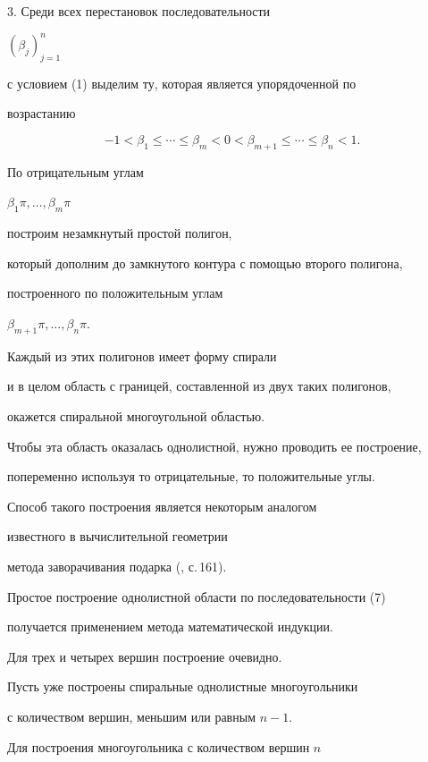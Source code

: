 3. Среди всех перестановок последовательности


$(\beta _{j})_{j=1}^{n}$


с условием (1) выделим ту, которая является упорядоченной по


возрастанию


\begin{equation}


-1 <\beta_{1}\le \dotsb \le \beta _{m}< 0 <


\beta _{m+1}\le \dotsb \le \beta _{n} < 1.


\end{equation}




По отрицательным углам


$\beta _{1}\pi,\dotsc,\beta _{m}\pi$


построим незамкнутый простой полигон,


который дополним до замкнутого контура с помощью второго полигона,


построенного по положительным углам


$\beta _{m+1}\pi,\dotsc,\beta _{n}\pi$.


Каждый из этих полигонов имеет форму спирали


и в целом область с границей, составленной из двух таких полигонов,


окажется спиральной многоугольной областью.


Чтобы эта область оказалась однолистной, нужно проводить ее построение,


попеременно используя то отрицательные, то положительные углы.


Способ такого построения является некоторым аналогом


известного в вычислительной геометрии


метода заворачивания подарка (\cite{Pre}, с.\,161).





Простое построение однолистной области по последовательности (7)


получается применением метода математической индукции.


Для трех и четырех вершин построение очевидно.


Пусть уже построены спиральные однолистные многоугольники


с количеством вершин, меньшим или равным $n-1$.


Для построения многоугольника с количеством вершин $n$


